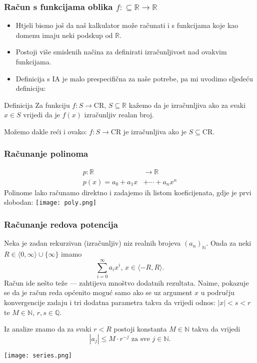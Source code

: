 \documentclass{beamer}
\def\N{\mathbb{N}}
\def\Q{\mathbb{Q}}
\def\R{\mathbb{R}}
\def\CR{\mathrm{CR}}
\begin{document}
\begin{frame}
    \frametitle{Račun s funkcijama oblika $f:\subseteq\R\to\R$}
    \begin{itemize}
        \item Htjeli bismo još da naš kalkulator može računati i s funkcijama koje kao domenu imaju neki podskup od $\R$.
        \pause
        \item Postoji više smislenih načina za definirati izračunljivost nad ovakvim funkcijama.
        \pause
        \item Definicija s IA je malo prespecifična za naše potrebe, pa mi uvodimo sljedeću definiciju:
    \end{itemize}
    \begin{block}{Definicija}
        Za funkciju $f:S\to\CR,\,S\subseteq\R$ kažemo da je izračunljiva ako za svaki $x\in S$ vrijedi da je
        $f(x)$ izračunljiv realan broj.
    \end{block}
    Možemo dakle reći i ovako: $f:S\to\CR$ je izračunljiva ako je $S\subseteq\CR$.
\end{frame}
\begin{frame}
    \frametitle{Računanje polinoma}
    \begin{align*}
        p:\R&\to\R \\
        p(x)=a_0+a_1x&+\dotsb+a_nx^n
    \end{align*}
    Polinome lako računamo direktno i zadajemo ih listom koeficijenata, gdje je prvi slobodan:
    \texttt{[image: poly.png]}
\end{frame}
\begin{frame}
    \frametitle{Računanje redova potencija}
    Neka je zadan rekurzivan (izračunljiv) niz realnih brojeva $(a_n)_{\N}$. Onda za neki $R\in\langle 0,\infty\rangle\cup\{\infty\}$ imamo
    \begin{equation*}
        \sum^{\infty}_{i=0}a_ix^i,\,x\in\langle -R,R\rangle.
    \end{equation*}
    \pause
    Račun ide nešto teže --- zahtijeva mnoštvo dodatnih rezultata. Naime, pokazuje se da je račun reda općenito moguć samo ako se uz argument $x$ u području
    konvergencije zadaju i tri dodatna parametra takva da vrijedi odnos: $|x|<s<r$ te $M\in\N$, $r,s\in\Q$.
    \pause
    
    Iz analize znamo da za svaki $r<R$ postoji konstanta $M\in\N$ takva da vrijedi
    \begin{equation*}
        |a_j|\leq M\cdot r^{-j}\text{ za sve }j\in\N.
    \end{equation*}\cite{weihrauch}
\end{frame}
\begin{frame}
    \texttt{[image: series.png]}
\end{frame}
\end{document}
